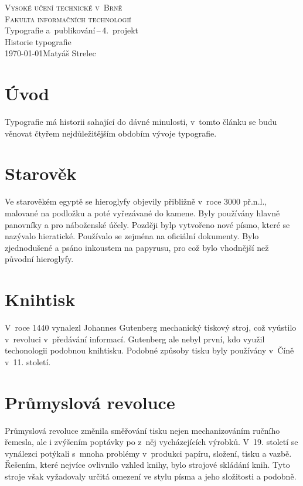 \documentclass[a4paper, 11pt]{article}
\begin{document}
\begin{titlepage}
    \begin{center}
		{\Huge{\textsc{Vysoké učení technické v~Brně}}\\
        \huge{\textsc{Fakulta informačních technologií}}\\}
		\LARGE{Typografie a~publikování\,{}--\,{}4.\ projekt}\\
        \Huge{Historie typografie\\}
        {\Large{\today \hfill Matyáš Strelec}}
	\end{center}
\end{titlepage}

\pagebreak

\section{Úvod}
Typografie má historii sahající do dávné minulosti, v~tomto článku se budu věnovat
čtyřem nejdůležitějším obdobím vývoje typografie.

\section{Starověk}
Ve starověkém egyptě se hieroglyfy objevily přibližně v~roce 3000 př.n.l., malované na podložku a poté
vyřezávané do kamene. Byly používány hlavně panovníky a pro náboženské účely. Později bylp vytvořeno nové
písmo, které se nazývalo hieratické. Používalo se zejména na oficiální dokumenty. Bylo zjednodušené a psáno 
inkoustem na papyrusu, pro což bylo vhodnější než původní hieroglyfy\cite{betro1996}\cite{Kleckova2015}.

\section{Knihtisk}
V~roce 1440 vynalezl Johannes Gutenberg mechanický tiskový stroj, což vyústilo v~revoluci v~předávání 
informací\cite{barbier2017}. Gutenberg ale nebyl první, kdo využil techonologii podobnou knihtisku.
Podobné způsoby tisku byly používány v~Číně v~11. století\cite{duchesne2006}\cite{musson1958}.


\section{Průmyslová revoluce}
Průmyslová revoluce změnila směřování tisku nejen mechanizováním ručního řemesla, ale i zvýšením poptávky po
z~něj vycházejících výrobků. V~19. století se vynálezci potýkali s~mnoha problémy v~produkci papíru,
složení, tisku a vazbě. Řešením, které nejvíce ovlivnilo vzhled knihy, bylo strojové skládání knih.
Tyto stroje však vyžadovaly určitá omezení ve stylu písma a jeho složitosti a podobně\cite{history2018}.
\end{document}
